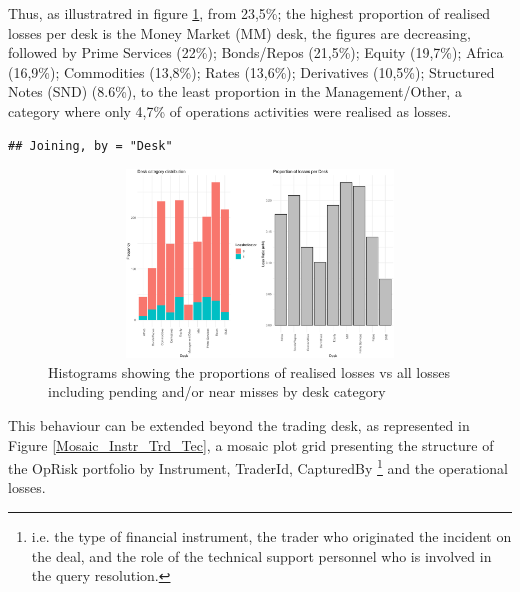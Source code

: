 \documentclass[]{article}
\let\rmarkdownfootnote\footnote%
\def\footnote{\protect\rmarkdownfootnote}
\begin{document}
Thus, as illustratred in figure \ref{Desk_Proportions}, from 23,5\%; the
highest proportion of realised losses per desk is the Money Market (MM)
desk, the figures are decreasing, followed by Prime Services (22\%);
Bonds/Repos (21,5\%); Equity (19,7\%); Africa (16,9\%); Commodities
(13,8\%); Rates (13,6\%); Derivatives (10,5\%); Structured Notes (SND)
(8.6\%), to the least proportion in the Management/Other, a category
where only 4,7\% of operations activities were realised as losses.

\singlespacing

\begin{verbatim}
## Joining, by = "Desk"
\end{verbatim}

\doublespacing

\begin{figure}
\centering
\includegraphics[width=15cm,height=5cm]{Exploratory_Desk_Proportions.eps}
\caption[Desk category by realised losses]{Histograms showing the proportions of realised losses vs all losses including pending and/or near misses by desk category}
\label{Desk_Proportions}
\end{figure}

This behaviour can be extended beyond the trading desk, as represented
in Figure \ref{Mosaic_Instr_Trd_Tec}, a mosaic plot grid presenting the
structure of the OpRisk portfolio by Instrument, TraderId, CapturedBy
\footnote{i.e. the type of financial instrument, the trader who originated the incident on the deal, and the role of the technical support personnel who is involved in the query resolution.}
and the operational losses.

\singlespacing

\doublespacing
\end{document}
